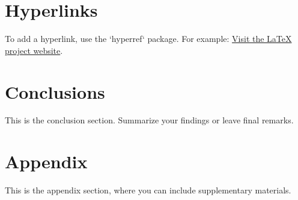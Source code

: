 \documentclass[12pt,a4paper]{article}
\begin{document}
\section{Hyperlinks}
To add a hyperlink, use the `hyperref` package. For example:
\href{https://www.latex-project.org/}{Visit the LaTeX project website}.

\section{Conclusions}
This is the conclusion section. Summarize your findings or leave final remarks.

\newpage
\appendix
\section{Appendix}
This is the appendix section, where you can include supplementary materials.
\end{document}
